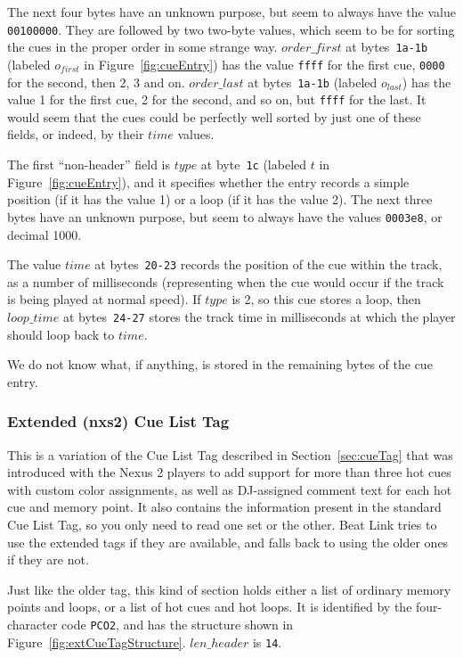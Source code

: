 \documentclass[11pt]{article}
\begin{document}
The next four bytes have an unknown purpose, but seem to always have
the value {\tt 00100000}. They are followed by two two-byte values,
which seem to be for sorting the cues in the proper order in some
strange way. $order\_first$ at bytes~{\tt 1a-1b} (labeled $o_{first}$
in Figure~\ref{fig:cueEntry}) has the value {\tt ffff} for the first
cue, {\tt 0000} for the second, then 2, 3 and on. $order\_last$ at
bytes~{\tt 1a-1b} (labeled $o_{last}$) has the value 1 for the first
cue, 2 for the second, and so on, but {\tt ffff} for the last. It
would seem that the cues could be perfectly well sorted by just one of
these fields, or indeed, by their $time$ values.

The first ``non-header'' field is $type$ at byte~{\tt 1c} (labeled $t$
in Figure~\ref{fig:cueEntry}), and it specifies whether the entry
records a simple position (if it has the value 1) or a loop (if it has
the value 2). The next three bytes have an unknown purpose, but seem
to always have the values {\tt 0003e8}, or decimal 1000.

The value $time$ at bytes~{\tt 20-23} records the position of the cue
within the track, as a number of milliseconds (representing when the
cue would occur if the track is being played at normal speed). If
$type$ is 2, so this cue stores a loop, then $loop\_time$ at
bytes~{\tt 24-27} stores the track time in milliseconds at which the
player should loop back to $time$.

We do not know what, if anything, is stored in the remaining bytes of
the cue entry.

\subsubsection{Extended (nxs2) Cue List Tag}
\label{sec:extCueTag}

This is a variation of the Cue List Tag described in
Section~\ref{sec:cueTag} that was introduced with the Nexus 2 players
to add support for more than three hot cues with custom color
assignments, as well as DJ-assigned comment text for each hot cue and
memory point. It also contains the information present in the standard
Cue List Tag, so you only need to read one set or the other. Beat Link
tries to use the extended tags if they are available, and falls back
to using the older ones if they are not.

Just like the older tag, this kind of section holds either a list of
ordinary memory points and loops, or a list of hot cues and hot loops.
It is identified by the four-character code {\tt PCO2}, and has the
structure shown in Figure~\ref{fig:extCueTagStructure}. $len\_header$
is {\tt 14}.
\end{document}
